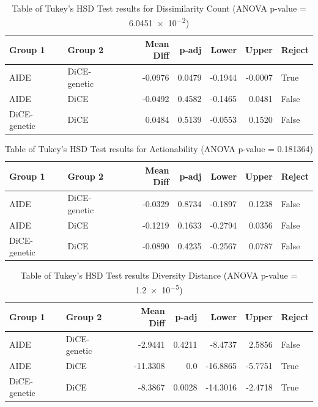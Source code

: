 \begin{table}[!htbp]
    \centering
    \begin{tabular}{llrrrrl}
        \toprule
        Group 1 & Group 2 & Mean Diff & p-adj & Lower & Upper & Reject \\
        \midrule
        AIDE          & DiCE-genetic   & -0.0976 & 0.0479 & -0.1944 & -0.0007 & True  \\
        AIDE          & DiCE  & -0.0492 & 0.4582 & -0.1465 &  0.0481 & False \\
        DiCE-genetic & DiCE  &  0.0484 & 0.5139 & -0.0553 &  0.1520 & False \\
        \bottomrule
    \end{tabular}
    \caption{Table of Tukey's HSD Test results for Dissimilarity Count (ANOVA p-value = \SI{6.0451e-2}{})}
    \label{tab:tukey-results-dis-count}
\end{table}
\begin{table}[!htbp]
    \centering
    \begin{tabular}{llrrrrl}
        \toprule
        Group 1 & Group 2 & Mean Diff & p-adj & Lower & Upper & Reject \\
        \midrule
        AIDE          & DiCE-genetic   & -0.0329 & 0.8734 & -0.1897 & 0.1238 & False \\
        AIDE          & DiCE  & -0.1219 & 0.1633 & -0.2794 & 0.0356 & False \\
        DiCE-genetic & DiCE  & -0.0890 & 0.4235 & -0.2567 & 0.0787 & False \\
        \bottomrule
    \end{tabular}
    \caption{Table of Tukey's HSD Test results for Actionability (ANOVA p-value = \SI{0.181364}{})}
    \label{tab:tukey-results-act}
\end{table}

\begin{table}[!htbp]
    \centering
    \begin{tabular}{llrrrrl}
        \toprule
        Group 1 & Group 2 & Mean Diff & p-adj & Lower & Upper & Reject \\
        \midrule
        AIDE          & DiCE-genetic   &  -2.9441 & 0.4211 &  -8.4737 &   2.5856 & False \\
        AIDE          & DiCE  & -11.3308 & 0.0    & -16.8865 &  -5.7751 & True  \\
        DiCE-genetic & DiCE  &  -8.3867 & 0.0028 & -14.3016 &  -2.4718 & True  \\
        \bottomrule
    \end{tabular}
    \caption{Table of Tukey's HSD Test results Diversity Distance (ANOVA p-value = \SI{1.2e-5}{})}
    \label{tab:tukey-results-div-dist}
\end{table}

